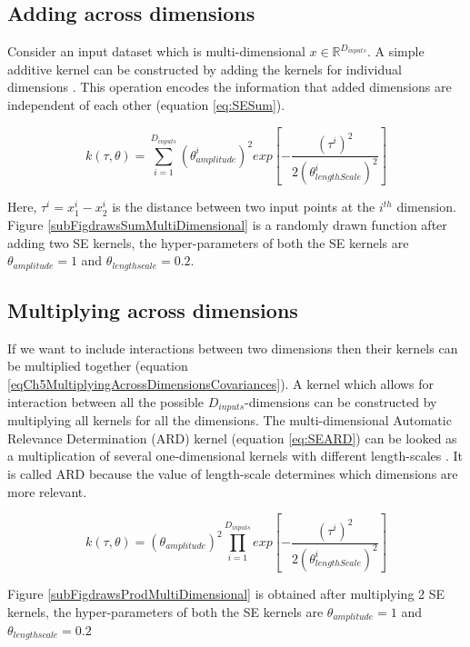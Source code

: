 \subsection{Adding across dimensions}
Consider an input dataset which is multi-dimensional $x \in \mathbb{R}^{D_{inputs}}$. A simple additive kernel can be constructed by adding the kernels for individual dimensions \cite{hastie1990generalized}. This operation encodes the information that added dimensions are independent of each other (equation \ref{eq:SESum}). 

\begin{equation}\label{eq:SESum}
k(\tau, \theta) = \sum_{i=1}^{D_{inputs}} (\theta_{amplitude}^{i})^2 exp\left [ -\frac{(\tau^{i})^2}{2(\theta_{lengthScale}^{i})^2} \right ]
\end{equation}

Here, $\tau^{i} = x^{i}_{1} - x^{i}_{2}$ is the distance between two input points at the $i^{th}$ dimension. Figure \ref{subFigdrawsSumMultiDimensional} is a randomly drawn function after adding two SE kernels, the hyper-parameters of both the SE kernels are $\theta_{amplitude}=1$ and $\theta_{lengthscale}=0.2$. 

\subsection{Multiplying across dimensions}
If we want to include interactions between two dimensions then their kernels can be multiplied together (equation \ref{eqCh5MultiplyingAcrossDimensionsCovariances}). A kernel which allows for interaction between all the possible $D_{inputs}$-dimensions can be constructed by multiplying all kernels for all the dimensions. The multi-dimensional Automatic Relevance Determination (ARD) kernel (equation \ref{eq:SEARD}) can be looked as a multiplication of several one-dimensional kernels with different length-scales \cite{Rasmussen2005}. It is called ARD because the value of length-scale determines which dimensions are more relevant.

\begin{equation}\label{eq:SEARD}
k(\tau, \theta) = (\theta_{amplitude})^2 \prod_{i=1}^{D_{inputs}}  exp\left [ -\frac{(\tau^{i})^2}{2(\theta_{lengthScale}^{i})^2} \right ]
\end{equation}

Figure \ref{subFigdrawsProdMultiDimensional} is obtained after multiplying 2 SE kernels, the hyper-parameters of both the SE kernels are $\theta_{amplitude}=1$ and $\theta_{lengthscale}=0.2$ 

